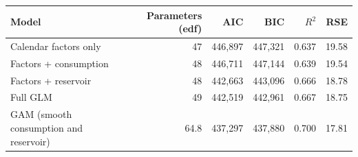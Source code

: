 \begin{tabular}{lrrrrr}
\toprule
Model & Parameters (edf) & AIC & BIC & $R^2$ & RSE \\
\midrule
Calendar factors only & 47 & 446{,}897 & 447{,}321 & 0.637 & 19.58 \\
Factors + consumption & 48 & 446{,}711 & 447{,}144 & 0.639 & 19.54 \\
Factors + reservoir & 48 & 442{,}663 & 443{,}096 & 0.666 & 18.78 \\
Full GLM & 49 & 442{,}519 & 442{,}961 & 0.667 & 18.75 \\
GAM (smooth consumption and reservoir) & 64.8 & 437{,}297 & 437{,}880 & 0.700 & 17.81 \\
\bottomrule
\end{tabular}
